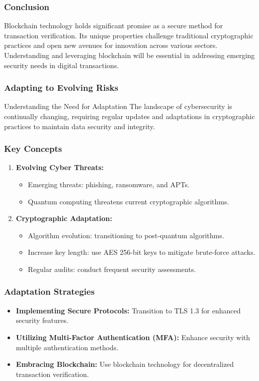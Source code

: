 \documentclass{beamer}
\begin{document}
\begin{frame}[fragile]
    \frametitle{Conclusion}
    Blockchain technology holds significant promise as a secure method for transaction verification. Its unique properties challenge traditional cryptographic practices and open new avenues for innovation across various sectors. Understanding and leveraging blockchain will be essential in addressing emerging security needs in digital transactions.
\end{frame}

\begin{frame}[fragile]
    \frametitle{Adapting to Evolving Risks}
    \begin{block}{Understanding the Need for Adaptation}
        The landscape of cybersecurity is continually changing, requiring regular updates and adaptations in cryptographic practices to maintain data security and integrity.
    \end{block}
\end{frame}

\begin{frame}[fragile]
    \frametitle{Key Concepts}
    \begin{enumerate}
        \item \textbf{Evolving Cyber Threats:}
        \begin{itemize}
            \item Emerging threats: phishing, ransomware, and APTs.
            \item Quantum computing threatens current cryptographic algorithms.
        \end{itemize}

        \item \textbf{Cryptographic Adaptation:}
        \begin{itemize}
            \item Algorithm evolution: transitioning to post-quantum algorithms.
            \item Increase key length: use AES 256-bit keys to mitigate brute-force attacks.
            \item Regular audits: conduct frequent security assessments.
        \end{itemize}
    \end{enumerate}
\end{frame}

\begin{frame}[fragile]
    \frametitle{Adaptation Strategies}
    \begin{itemize}
        \item \textbf{Implementing Secure Protocols:} 
        Transition to TLS 1.3 for enhanced security features.
        
        \item \textbf{Utilizing Multi-Factor Authentication (MFA):} 
        Enhance security with multiple authentication methods.
        
        \item \textbf{Embracing Blockchain:} 
        Use blockchain technology for decentralized transaction verification.
    \end{itemize}
\end{frame}
\end{document}
